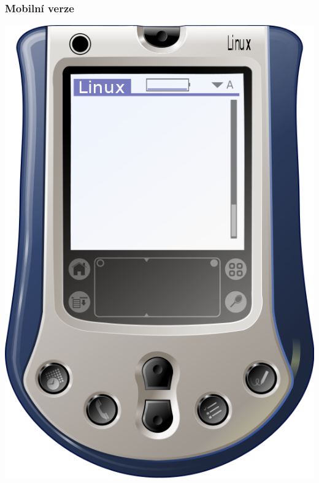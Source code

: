 \documentclass{beamer}
\begin{document}
\begin{frame}
\frametitle{Mobilní verze}
\begin{center}
\includegraphics[height=.7\paperheight]{Palm}
\end{center}
\end{frame}
\end{document}
